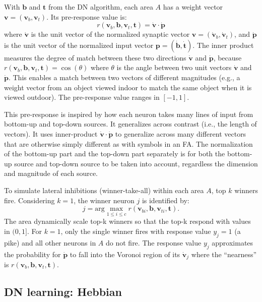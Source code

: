 \documentclass[conference]{IEEEtran}
\def\b{\mathbf b}
\def\p{\mathbf p}
\def\t{\mathbf t}
\def\v{\mathbf v}
\begin{document}
With $\b$ and $\t$ from the DN algorithm, each area $A$ has a
weight vector $\v= (\v_b, \v_t)$.  Its pre-response value is:
\begin{equation}
\label{EQ:pre-response}
r (\v_b, \b, \v_t, \t)  
= \dot{\v} \cdot \dot{\p}
\end{equation}
where
$\dot{\v}$ is the unit vector of the normalized synaptic vector 
$\v= (\dot{\v}_b, \dot{\v}_t)$, and $\dot{\p}$ is the unit vector of the normalized input vector 
$\p= (\dot{\b}, \dot{\t})$.    The inner product measures the degree of match between these two directions 
$\dot{\v}$ and $\dot{\p}$, because $r (\v_b, \b, \v_t, \t) = \cos(\theta) $ where $\theta$ is the angle between 
two unit vectors $\dot{\v}$ and $\dot{\p}$.
This enables a match between two vectors of different magnitudes (e.g., a weight vector from an object viewed indoor to match the same object when it is viewed  outdoor). 
The pre-response value ranges in $[-1, 1]$.

This pre-response is inspired by how each neuron takes many lines of input from bottom-up and top-down sources.  It generalizes across contrast (i.e., the length of vectors).   It uses inner-product $\dot{\v} \cdot \dot{\p}$ to
generalize across many different vectors that are otherwise simply different as with symbols in an FA.  The normalization of the bottom-up part and the top-down part separately is for both the bottom-up source and top-down source
to be taken into account, regardless the dimension and magnitude of each source. 

To simulate lateral inhibitions (winner-take-all) within each area $A$, top $k$ winners fire.  Considering $k=1$, the winner neuron $j$ is identified by:
\begin{equation}
j = \mbox{arg}\max_{1\le i \le c}  r (\v_{bi}, \b, \v_{ti}, \t) .
\label{EQ:jmax}
\end{equation}
The area dynamically scale top-k winners  so that the top-k respond with values in $(0, 1]$.   
For $k=1$, only the single winner fires with response value 
$y_j=1$ (a pike) and all other neurons in $A$ do not fire.  The response value $y_j$ approximates the 
probability for $\dot{\p} $ to fall into the Voronoi region of its $\dot{\v}_j$ where the ``nearness'' 
is $r (\v_b, \b, \v_t, \t)$.   

\subsection{DN learning: Hebbian}
  
\end{document}
